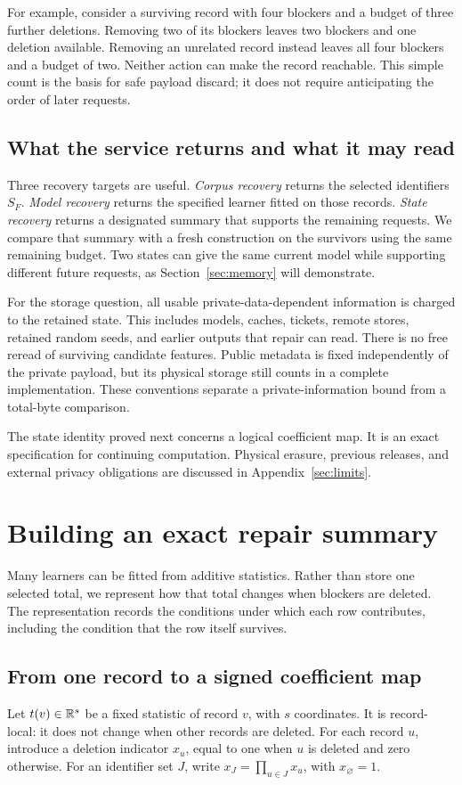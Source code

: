For example, consider a surviving record with four blockers and a budget
of three further deletions. Removing two of its blockers leaves two
blockers and one deletion available. Removing an unrelated record instead
leaves all four blockers and a budget of two. Neither action can make the
record reachable. This simple count is the basis for safe payload discard;
it does not require anticipating the order of later requests.

\subsection{What the service returns and what it may read}
Three recovery targets are useful. \emph{Corpus recovery} returns the
selected identifiers $S_F$. \emph{Model recovery} returns the specified
learner fitted on those records. \emph{State recovery} returns a designated
summary that supports the remaining requests. We compare that summary
with a fresh construction on the survivors using the same remaining
budget. Two states can give the same current model while supporting
different future requests, as Section~\ref{sec:memory} will demonstrate.

For the storage question, all usable private-data-dependent information
is charged to the retained state. This includes models, caches, tickets,
remote stores, retained random seeds, and earlier outputs that repair can
read. There is no free reread of surviving candidate features. Public
metadata is fixed independently of the private payload, but its physical
storage still counts in a complete implementation. These conventions
separate a private-information bound from a total-byte comparison.

The state identity proved next concerns a logical coefficient map.
It is an exact specification for continuing computation. Physical erasure,
previous releases, and external privacy obligations are discussed in
Appendix~\ref{sec:limits}.

\section{Building an exact repair summary}\label{sec:method}
Many learners can be fitted from additive statistics. Rather than store
one selected total, we represent how that total changes when blockers
are deleted. The representation records the conditions under which each
row contributes, including the condition that the row itself survives.

\subsection{From one record to a signed coefficient map}
Let $t(v)\in\mathbb R^s$ be a fixed statistic of record $v$, with $s$ coordinates.
It is record-local: it does not change when other records are deleted.
For each record $u$, introduce a deletion indicator $x_u$, equal to one
when $u$ is deleted and zero otherwise. For an identifier set $J$, write
$x_J=\prod_{u\in J}x_u$, with $x_\varnothing=1$.

